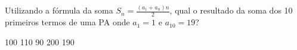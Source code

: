 Utilizando a fórmula da soma $S_n=\frac{(a_1+a_n)n}{2}$, qual o resultado da soma dos 10 primeiros termos de uma PA onde $a_1 = 1$ e $a_{10} = 19$?

100
110
90
200
190





